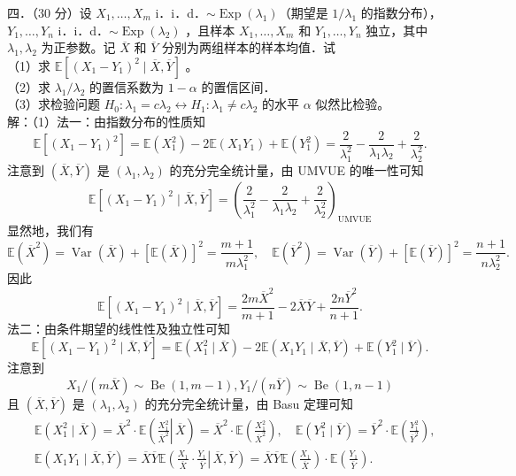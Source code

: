 \documentclass[UTF8,openany]{book}
\begin{document}
	
	\noindent 四．（30 分）设 $X_1, \ldots, X_m$ i．i．d．$\sim \operatorname{Exp}\left(\lambda_1\right)$（期望是 $1 / \lambda_1$ 的指数分布），$Y_1, \ldots, Y_n$ i．i．d．$\sim \operatorname{Exp}\left(\lambda_2\right)$ ，且样本 $X_1, \ldots, X_m$ 和 $Y_1, \ldots, Y_n$ 独立，其中 $\lambda_1, \lambda_2$ 为正参数。记 $\overline{X}$ 和 $\overline{Y}$ 分别为两组样本的样本均值．试\\
	（1）求 $\mathbb{E}\left[\left(X_1-Y_1\right)^2 \mid \overline{X}, \overline{Y}\right]$ 。\\
	（2）求 $\lambda_1 / \lambda_2$ 的置信系数为 $1-\alpha$ 的置信区间．\\
	（3）求检验问题 $H_0: \lambda_1=c \lambda_2 \leftrightarrow H_1: \lambda_1 \neq c \lambda_2$ 的水平 $\alpha$ 似然比检验。\\
	解：（1）法一：由指数分布的性质知
	$$
	\mathbb{E}\left[\left(X_1-Y_1\right)^2\right]=\mathbb{E}\left(X_1^2\right)-2 \mathbb{E}\left(X_1 Y_1\right)+\mathbb{E}\left(Y_1^2\right)=\frac{2}{\lambda_1^2}-\frac{2}{\lambda_1 \lambda_2}+\frac{2}{\lambda_2^2} .
	$$
	注意到 $(\overline{X}, \overline{Y})$ 是 $\left(\lambda_1, \lambda_2\right)$ 的充分完全统计量，由 UMVUE 的唯一性可知
	$$
	\mathbb{E}\left[\left(X_1-Y_1\right)^2 \mid \overline{X}, \overline{Y}\right]=\left(\frac{2}{\lambda_1^2}-\frac{2}{\lambda_1 \lambda_2}+\frac{2}{\lambda_2^2}\right)_{\mathrm{UMVUE}}
	$$
	显然地，我们有
	$$
	\mathbb{E}\left(\overline{X}^2\right)=\operatorname{Var}(\overline{X})+[\mathbb{E}(\overline{X})]^2=\frac{m+1}{m \lambda_1^2}, \quad \mathbb{E}\left(\overline{Y}^2\right)=\operatorname{Var}(\overline{Y})+[\mathbb{E}(\overline{Y})]^2=\frac{n+1}{n \lambda_2^2} .
	$$
	因此
	$$
	\mathbb{E}\left[\left(X_1-Y_1\right)^2 \mid \overline{X}, \overline{Y}\right]=\frac{2 m \overline{X}^2}{m+1}-2 \overline{X} \overline{Y}+\frac{2 n \overline{Y}^2}{n+1} .
	$$
	法二：由条件期望的线性性及独立性可知
	$$
	\mathbb{E}\left[\left(X_1-Y_1\right)^2 \mid \overline{X}, \overline{Y}\right]=\mathbb{E}\left(X_1^2 \mid \overline{X}\right)-2 \mathbb{E}\left(X_1 Y_1 \mid \overline{X}, \overline{Y}\right)+\mathbb{E}\left(Y_1^2 \mid \overline{Y}\right) .
	$$
	注意到 
	$$X_1 /(m \overline{X}) \sim \operatorname{Be}(1, m-1), Y_1 /(n \overline{Y}) \sim \operatorname{Be}(1, n-1)$$
	且 $(\overline{X}, \overline{Y})$ 是 $\left(\lambda_1, \lambda_2\right)$ 的充分完全统计量，由 Basu 定理可知
	$$
	\begin{aligned}
		& \mathbb{E}\left(X_1^2 \mid \overline{X}\right)=\overline{X}^2 \cdot \mathbb{E}\left(\left.\frac{X_1^2}{\overline{X}^2} \right\rvert\, \overline{X}\right)=\overline{X}^2 \cdot \mathbb{E}\left(\frac{X_1^2}{\overline{X}^2}\right), \quad \mathbb{E}\left(Y_1^2 \mid \overline{Y}\right)=\overline{Y}^2 \cdot \mathbb{E}\left(\frac{Y_1^2}{\overline{Y}^2}\right), \\
		& \mathbb{E}\left(X_1 Y_1 \mid \overline{X}, \overline{Y}\right)=\overline{X} \overline{Y} \mathbb{E}\left(\left.\frac{X_1}{\overline{X}} \cdot \frac{Y_1}{\overline{Y}} \right\rvert\, \overline{X}, \overline{Y}\right)=\overline{X} \overline{Y} \mathbb{E}\left(\frac{X_1}{\overline{X}}\right) \cdot \mathbb{E}\left(\frac{Y_1}{\overline{Y}}\right) .
	\end{aligned}
	$$
\end{document}
